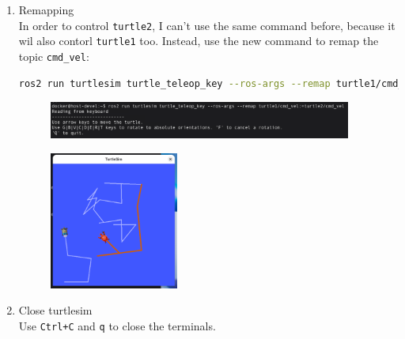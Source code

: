 \documentclass[12pt, a4paper]{article}
\begin{document}
\begin{enumerate}
\begin{enumerate}
\end{enumerate}
\newpage
\item Remapping\\
	In order to control \texttt{turtle2}, I can't use the same command before, because it wil also contorl \texttt{turtle1} too. Instead, use the new command to remap the topic \texttt{cmd\_vel}:
\begin{lstlisting}[language=bash]
ros2 run turtlesim turtle_teleop_key --ros-args --remap turtle1/cmd_vel:=turtle2/cmd_vel
\end{lstlisting}
\begin{figure}[h]
	\setlength{\leftskip}{2.4em}
	\includegraphics[width=0.94\textwidth]{p1.2-12}
\end{figure}
\begin{figure}[h]
	\centering
	\includegraphics[width=0.4\textwidth]{p1.2-13}
\end{figure}
\item Close turtlesim\\
	Use \texttt{Ctrl+C} and \texttt{q} to close the terminals.
\end{enumerate}
\newpage
\end{document}
